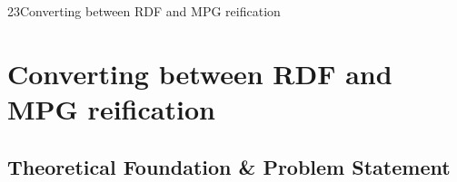 
\begin{question}{2}{3}{Converting between RDF and MPG reification}



%
\section{Converting between RDF and MPG reification}
\subsection{Theoretical Foundation \& Problem Statement}


\end{question}
